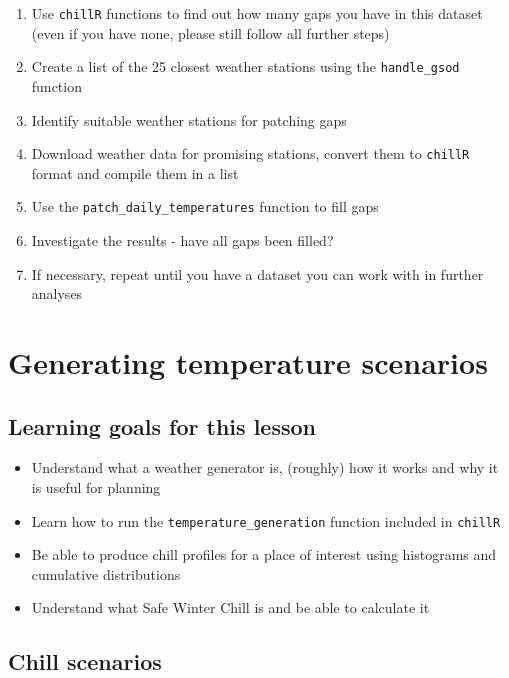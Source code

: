 \documentclass[
]{book}
\providecommand{\tightlist}{%
  \setlength{\itemsep}{0pt}\setlength{\parskip}{0pt}}
\begin{document}
\begin{enumerate}
\def\labelenumi{\arabic{enumi})}
\tightlist
\item
  Use \texttt{chillR} functions to find out how many gaps you have in this dataset (even if you have none, please still follow all further steps)
\item
  Create a list of the 25 closest weather stations using the \texttt{handle\_gsod} function
\item
  Identify suitable weather stations for patching gaps
\item
  Download weather data for promising stations, convert them to \texttt{chillR} format and compile them in a list
\item
  Use the \texttt{patch\_daily\_temperatures} function to fill gaps
\item
  Investigate the results - have all gaps been filled?
\item
  If necessary, repeat until you have a dataset you can work with in further analyses
\end{enumerate}

\hypertarget{generating-temperature-scenarios}{%
\chapter{Generating temperature scenarios}\label{generating-temperature-scenarios}}

\hypertarget{goals_temperature_scenarios}{%
\section*{Learning goals for this lesson}\label{goals_temperature_scenarios}}

\begin{itemize}
\tightlist
\item
  Understand what a weather generator is, (roughly) how it works and why it is useful for planning
\item
  Learn how to run the \texttt{temperature\_generation} function included in \texttt{chillR}
\item
  Be able to produce chill profiles for a place of interest using histograms and cumulative distributions
\item
  Understand what Safe Winter Chill is and be able to calculate it
\end{itemize}

\hypertarget{chill-scenarios}{%
\section{Chill scenarios}\label{chill-scenarios}}
\end{document}
